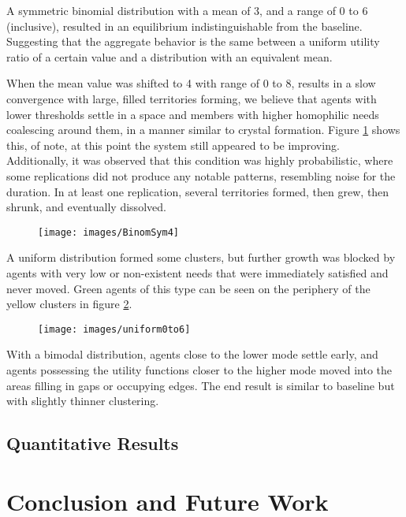 \documentclass[sigplan,nonacm]{acmart}
\begin{document}
A symmetric binomial distribution with a mean of 3, and a range of 0 to 6 (inclusive), resulted in an equilibrium indistinguishable from the baseline.
Suggesting that the aggregate behavior is the same between a uniform utility ratio of a certain value and a distribution 
with an equivalent mean.

When the mean value was shifted to 4 with range of 0 to 8, results in a slow convergence with large, filled territories forming,
we believe that agents with lower thresholds settle in a space and members with higher homophilic needs coalescing around
them, in a manner similar to crystal formation. Figure \ref{fig:binomsym4} shows this, of note, at this point the system 
still appeared to be improving. Additionally, it was observed that this condition was highly probabilistic, where some replications did not
produce any notable patterns, resembling noise for the duration.
In at least one replication, several territories formed, then grew, then shrunk, and eventually dissolved. 

\begin{figure}
	\centering
	\texttt{[image: images/BinomSym4]}
	\caption{}
	\label{fig:binomsym4}
\end{figure}

A uniform distribution formed some clusters, but further growth was blocked by agents with very low or non-existent needs 
that were immediately satisfied and never moved. Green agents of this type can be seen on the periphery of the yellow 
clusters in figure \ref{fig:uniform0to6}.

\begin{figure}
	\centering
	\texttt{[image: images/uniform0to6]}
	\caption{}
	\label{fig:uniform0to6}
\end{figure}

With a bimodal distribution, agents close to the lower mode settle early, and agents possessing the utility functions
closer to the higher mode moved into the areas filling in gaps or occupying edges. 
The end result is similar to baseline but with slightly thinner clustering.

\subsection{Quantitative Results}

\section{Conclusion and Future Work}
\end{document}
